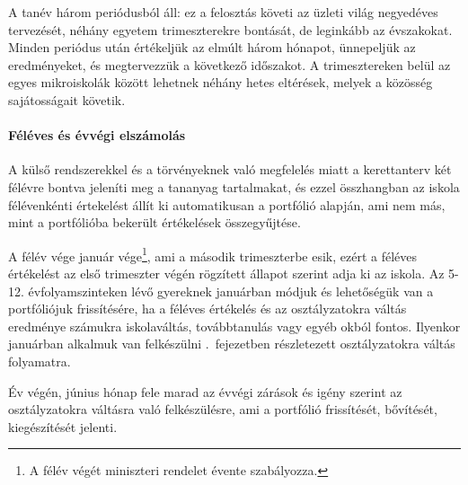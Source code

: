 A tanév három periódusból áll: ez a felosztás követi az üzleti világ negyedéves tervezését, néhány egyetem trimeszterekre bontását, de leginkább az évszakokat. Minden periódus után értékeljük az elmúlt három hónapot, ünnepeljük az eredményeket, és megtervezzük a következő időszakot.  A trimesztereken belül az egyes mikroiskolák között lehetnek néhány hetes eltérések, melyek a közösség sajátosságait követik.

\paragraph{Féléves és évvégi elszámolás}
\label{sec:feleves_bontas}
A külső rendszerekkel és a törvényeknek való megfelelés miatt a kerettanterv két félévre bontva jeleníti meg a tananyag tartalmakat, és ezzel összhangban az iskola félévenkénti értekelést állít ki automatikusan a portfólió alapján, ami nem más, mint a portfólióba bekerült értékelések összegyűjtése.

A félév vége január vége\footnote{A félév végét miniszteri rendelet évente szabályozza.}, ami a második trimeszterbe esik, ezért a féléves értékelést az első trimeszter végén rögzített állapot szerint adja ki az iskola.  Az 5-12. évfolyamszinteken lévő gyereknek januárban módjuk és lehetőségük van a portfóliójuk frissítésére, ha a féléves értékelés és az osztályzatokra váltás eredménye számukra iskolaváltás, továbbtanulás vagy egyéb okból fontos. Ilyenkor januárban alkalmuk van felkészülni .~fejezetben részletezett osztályzatokra váltás folyamatra.

Év végén, június hónap fele marad az évvégi zárások és igény szerint az osztályzatokra váltásra való felkészülésre, ami a portfólió frissítését, bővítését, kiegészítését jelenti.